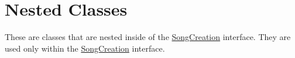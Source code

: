 \hypertarget{group___s_c_nest_class}{}\section{Nested Classes}
\label{group___s_c_nest_class}
These are classes that are nested inside of the \hyperlink{class_song_creation}{Song\+Creation} interface. They are used only within the \hyperlink{class_song_creation}{Song\+Creation} interface. 